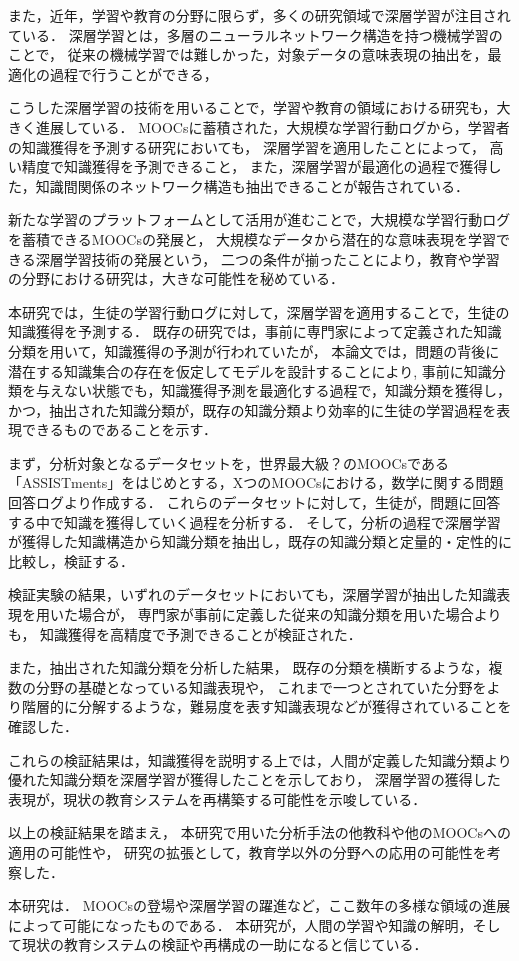 また，近年，学習や教育の分野に限らず，多くの研究領域で深層学習が注目されている．
深層学習とは，多層のニューラルネットワーク構造を持つ機械学習のことで，
従来の機械学習では難しかった，対象データの意味表現の抽出を，最適化の過程で行うことができる，


こうした深層学習の技術を用いることで，学習や教育の領域における研究も，大きく進展している．
MOOCsに蓄積された，大規模な学習行動ログから，学習者の知識獲得を予測する研究においても，
深層学習を適用したことによって，
高い精度で知識獲得を予測できること，
また，深層学習が最適化の過程で獲得した，知識間関係のネットワーク構造も抽出できることが報告されている．


新たな学習のプラットフォームとして活用が進むことで，大規模な学習行動ログを蓄積できるMOOCsの発展と，
大規模なデータから潜在的な意味表現を学習できる深層学習技術の発展という，
二つの条件が揃ったことにより，教育や学習の分野における研究は，大きな可能性を秘めている．


本研究では，生徒の学習行動ログに対して，深層学習を適用することで，生徒の知識獲得を予測する．
既存の研究では，事前に専門家によって定義された知識分類を用いて，知識獲得の予測が行われていたが，
本論文では，問題の背後に潜在する知識集合の存在を仮定してモデルを設計することにより,
事前に知識分類を与えない状態でも，知識獲得予測を最適化する過程で，知識分類を獲得し，
かつ，抽出された知識分類が，既存の知識分類より効率的に生徒の学習過程を表現できるものであることを示す．


まず，分析対象となるデータセットを，世界最大級？のMOOCsである「ASSISTments」をはじめとする，XつのMOOCsにおける，数学に関する問題回答ログより作成する．
これらのデータセットに対して，生徒が，問題に回答する中で知識を獲得していく過程を分析する．
そして，分析の過程で深層学習が獲得した知識構造から知識分類を抽出し，既存の知識分類と定量的・定性的に比較し，検証する．


検証実験の結果，いずれのデータセットにおいても，深層学習が抽出した知識表現を用いた場合が，
専門家が事前に定義した従来の知識分類を用いた場合よりも，
知識獲得を高精度で予測できることが検証された．

また，抽出された知識分類を分析した結果，
既存の分類を横断するような，複数の分野の基礎となっている知識表現や，
これまで一つとされていた分野をより階層的に分解するような，難易度を表す知識表現などが獲得されていることを確認した．


これらの検証結果は，知識獲得を説明する上では，人間が定義した知識分類より優れた知識分類を深層学習が獲得したことを示しており，
深層学習の獲得した表現が，現状の教育システムを再構築する可能性を示唆している．


以上の検証結果を踏まえ，
本研究で用いた分析手法の他教科や他のMOOCsへの適用の可能性や，
研究の拡張として，教育学以外の分野への応用の可能性を考察した．


本研究は．
MOOCsの登場や深層学習の躍進など，ここ数年の多様な領域の進展によって可能になったものである．
本研究が，人間の学習や知識の解明，そして現状の教育システムの検証や再構成の一助になると信じている．



